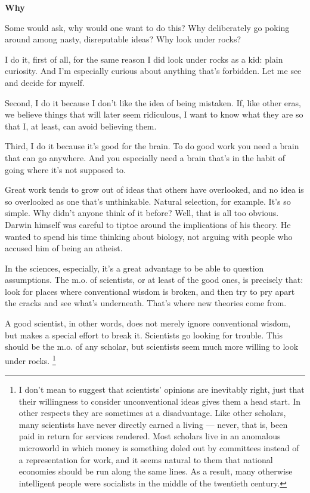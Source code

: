 \textbf{Why}

Some would ask, why would one want to do this? Why deliberately go
poking around among nasty, disreputable ideas? Why look under rocks?

I do it, first of all, for the same reason I did look under rocks as a
kid: plain curiosity. And I'm especially curious about anything that's
forbidden. Let me see and decide for myself.

Second, I do it because I don't like the idea of being mistaken. If,
like other eras, we believe things that will later seem ridiculous, I
want to know what they are so that I, at least, can avoid believing
them.

Third, I do it because it's good for the brain. To do good work you need
a brain that can go anywhere. And you especially need a brain that's in
the habit of going where it's not supposed to.

Great work tends to grow out of ideas that others have overlooked, and
no idea is so overlooked as one that's unthinkable. Natural selection,
for example. It's so simple. Why didn't anyone think of it before? Well,
that is all too obvious. Darwin himself was careful to tiptoe around the
implications of his theory. He wanted to spend his time thinking about
biology, not arguing with people who accused him of being an atheist.

In the sciences, especially, it's a great advantage to be able to
question assumptions. The m.o. of scientists, or at least of the good
ones, is precisely that: look for places where conventional wisdom is
broken, and then try to pry apart the cracks and see what's underneath.
That's where new theories come from.

A good scientist, in other words, does not merely ignore conventional
wisdom, but makes a special effort to break it. Scientists go looking
for trouble. This should be the m.o. of any scholar, but scientists seem
much more willing to look under rocks. \footnote{I don't mean to suggest that scientists' opinions are
inevitably right, just that their willingness to consider unconventional
ideas gives them a head start. In other respects they are sometimes at a
disadvantage. Like other scholars, many scientists have never directly
earned a living --- never, that is, been paid in return for services
rendered. Most scholars live in an anomalous microworld in which money
is something doled out by committees instead of a representation for
work, and it seems natural to them that national economies should be run
along the same lines. As a result, many otherwise intelligent people
were socialists in the middle of the twentieth century.}

